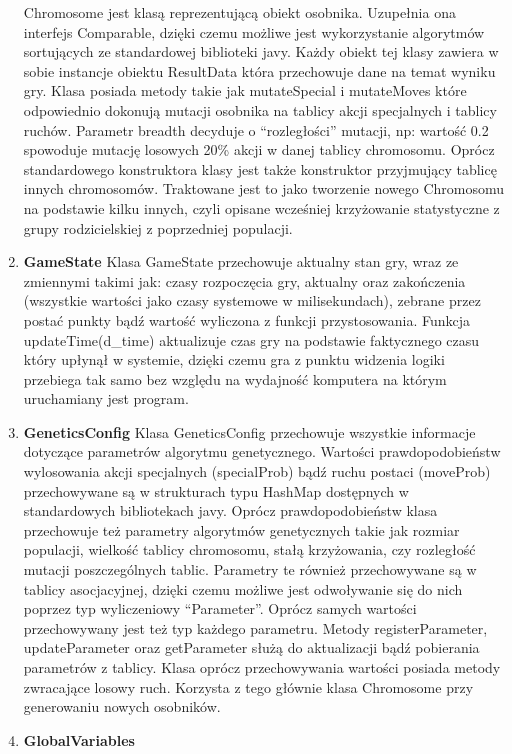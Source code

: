\begin{par}
\begin{enumerate}
	Chromosome jest klasą reprezentującą obiekt osobnika. Uzupełnia ona interfejs Comparable, dzięki czemu możliwe jest wykorzystanie algorytmów sortujących ze standardowej biblioteki javy. Każdy obiekt tej klasy zawiera w sobie instancje obiektu ResultData która przechowuje dane na temat wyniku gry. Klasa posiada metody takie jak mutateSpecial i mutateMoves które odpowiednio dokonują mutacji osobnika na tablicy akcji specjalnych i tablicy ruchów. Parametr breadth decyduje o ``rozległości'' mutacji, np: wartość 0.2 spowoduje mutację losowych 20\% akcji w danej tablicy chromosomu. Oprócz standardowego konstruktora klasy jest także konstruktor przyjmujący tablicę innych chromosomów. Traktowane jest to jako tworzenie nowego Chromosomu na podstawie kilku innych, czyli opisane wcześniej krzyżowanie statystyczne z grupy rodzicielskiej z poprzedniej populacji. 
	\item{\bf GameState }\newline
	Klasa GameState przechowuje aktualny stan gry, wraz ze zmiennymi takimi jak: czasy rozpoczęcia gry, aktualny oraz zakończenia (wszystkie wartości jako czasy systemowe w milisekundach), zebrane przez postać punkty bądź wartość wyliczona z funkcji przystosowania. Funkcja updateTime(d\_time) aktualizuje czas gry na podstawie faktycznego czasu który upłynął w systemie, dzięki czemu gra z punktu widzenia logiki przebiega tak samo bez względu na wydajność komputera na którym uruchamiany jest program.
	\item{\bf GeneticsConfig }\newline
	Klasa GeneticsConfig przechowuje wszystkie informacje dotyczące parametrów algorytmu genetycznego. Wartości prawdopodobieństw wylosowania akcji specjalnych (specialProb) bądź ruchu postaci (moveProb) przechowywane są w strukturach typu HashMap dostępnych w standardowych bibliotekach javy.
	Oprócz prawdopodobieństw klasa przechowuje też parametry algorytmów genetycznych takie jak rozmiar populacji, wielkość tablicy chromosomu, stałą krzyżowania, czy rozległość mutacji poszczególnych tablic. Parametry te również przechowywane są w tablicy asocjacyjnej, dzięki czemu możliwe jest odwoływanie się do nich poprzez typ wyliczeniowy ``Parameter''.
	Oprócz samych wartości przechowywany jest też typ każdego parametru. Metody registerParameter, updateParameter oraz getParameter służą do aktualizacji bądź pobierania parametrów z tablicy. Klasa oprócz przechowywania wartości posiada metody zwracające losowy ruch. Korzysta z tego głównie klasa Chromosome przy generowaniu nowych osobników.
	\item{\bf GlobalVariables }\newline

\end{enumerate}
\end{par}
